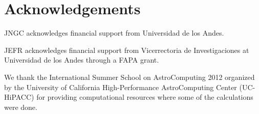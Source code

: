 \documentclass{emulateapj}
\begin{document}
\section*{Acknowledgements}

JNGC acknowledges financial support from Universidad de los
Andes. 

JEFR acknowledges financial support from Vicerrectoria de
Investigaciones at Universidad de los Andes through a FAPA grant.

We thank the International Summer School on AstroComputing
2012 organized by the University of California High-Performance
AstroComputing Center (UC-HiPACC) for providing computational
resources where some of the calculations were done. 





 
\end{document}
